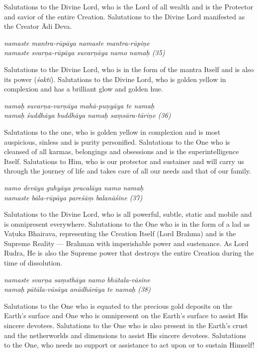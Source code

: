 \documentclass[12pt,oneside,a4paper]{article}
\newenvironment{shloka}[1]
  {\bigskip\center#1\varwidth{\linewidth}}
  {\endvarwidth\endcenter\bigskip}
\newcommand{\tl}[1]{\emph{#1}}
\begin{document}
Salutations to the Divine Lord, who is the Lord of all wealth and is
the Protector and savior of the entire Creation. Salutations to the Divine Lord
manifested as the Creator Ādi Deva.

\begin{shloka}\itshape
  namaste mantra-rūpāya namaste mantra-rūpiṇe\\
  namaste svarṇa-rūpāya suvarṇāya namo namaḥ (35)
\end{shloka}

Salutations to the Divine Lord, who is in the form of the mantra Itself and is
also its power (\tl{śakti}). Salutations to the Divine Lord, who is golden
yellow in complexion and has a brilliant glow and golden hue.

\begin{shloka}\itshape
  namaḥ suvarṇa-varṇāya mahā-puṇyāya te namaḥ\\
  namaḥ śuddhāya buddhāya namaḥ saṃsāra-tāriṇe (36)
\end{shloka}

Salutations to the one, who is golden yellow in complexion and is most
auspicious, sinless and is purity personified. Salutations to the One who is
cleansed of all karmas, belongings and obsessions and is the superintelligence
Itself. Salutations to Him, who is our protector and sustainer and will carry us
through the journey of life and takes care of all our needs and that of
our family.

\begin{shloka}\itshape
  namo devāya guhyāya pracalāya namo namaḥ\\
  namaste bāla-rūpāya pareśāṃ balanāśine (37)
\end{shloka}

Salutations to the Divine Lord, who is all powerful, subtle, static and mobile
and is omnipresent everywhere. Salutations to the One who is in the form of
a lad as Vaṭuka Bhairava, representing the Creation Itself (Lord Brahma) and is
the Supreme Reality — Brahman with imperishable power and sustenance. As Lord
Rudra, He is also the Supreme power that destroys the entire Creation during
the time of dissolution.

\begin{shloka}\itshape
  namaste svarṇa saṃsthāya namo bhūtala-vāsine\\
  namaḥ pātāla-vāsāya anādhārāya te namaḥ (38)
\end{shloka}

Salutations to the One who is equated to the precious gold deposits on
the Earth’s surface and One who is omnipresent on the Earth’s surface to assist
His sincere devotees. Salutations to the One who is also present in the Earth’s
crust and the netherworlds and dimensions to assist His sincere devotees.
Salutations to the One, who needs no support or assistance to act upon or to
sustain Himself!
\end{document}
